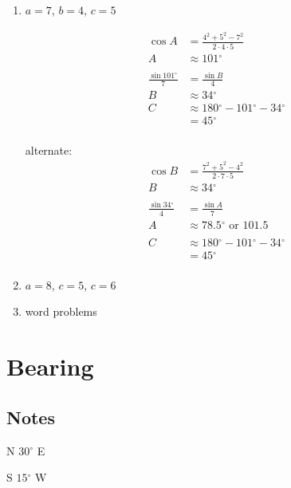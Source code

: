 \documentclass{exam}
\newcommand{\dg}{\ensuremath{^\circ}}
\begin{document}
  \begin{enumerate}

    \item $a = 7$, $b = 4$, $c = 5$

      \begin{solution}
        \begin{align*}
          \cos A & = \frac{4^2 + 5^2 - 7^2}{2 \cdot 4 \cdot 5} \\
          A      & \approx 101 \dg \\
          \\
          \frac{\sin 101 \dg}{7} & = \frac{\sin B}{4} \\
          B                      & \approx 34 \dg
          \\
          C & \approx 180 \dg - 101 \dg - 34 \dg \\
            & = 45 \dg \\
        \end{align*}

        alternate:
        \begin{align*}
          \cos B & = \frac{7^2 + 5^2 - 4^2}{2 \cdot 7 \cdot 5} \\
          B      & \approx 34 \dg \\
          \\
          \frac{\sin 34 \dg}{4} & = \frac{\sin A}{7} \\
          A                      & \approx 78.5 \dg \text{ or } 101.5 \\
          \\
          C & \approx 180 \dg - 101 \dg - 34 \dg \\
            & = 45 \dg \\
        \end{align*}

      \end{solution}

    \item $a = 8$, $c = 5$, $c = 6$

    \item word problems

  \end{enumerate}

  \section{Bearing}
  \subsection{Notes}
  \begin{itemize*}
    \item N $30 \dg$ E
    \item S $15 \dg$ W
  \end{itemize*}
\end{document}
